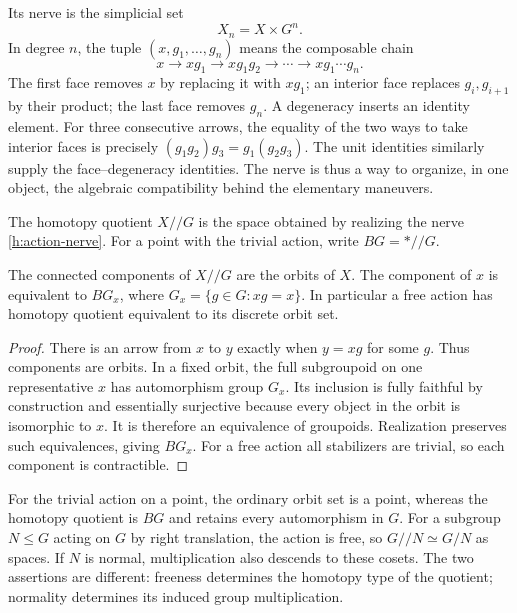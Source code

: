 Its nerve is the simplicial set
\begin{equation}\label{h:action-nerve}
 X_n=X\times G^n.
\end{equation}
In degree $n$, the tuple $(x,g_1,\ldots,g_n)$ means the composable chain
\[
 x\longrightarrow xg_1\longrightarrow xg_1g_2
   \longrightarrow\cdots\longrightarrow xg_1\cdots g_n.
\]
The first face removes $x$ by replacing it with $xg_1$; an interior face
replaces $g_i,g_{i+1}$ by their product; the last face removes $g_n$.
A degeneracy inserts an identity element.  For three consecutive arrows,
the equality of the two ways to take interior faces is precisely
$(g_1g_2)g_3=g_1(g_2g_3)$.  The unit identities similarly supply the
face--degeneracy identities.  The nerve is thus a way to organize, in
one object, the algebraic compatibility behind the elementary maneuvers.

\begin{definition}\label{h:homotopy-quotient}
The homotopy quotient $X/\!/G$ is the space obtained by realizing the
nerve \eqref{h:action-nerve}.  For a point with the trivial action, write
$BG=*/\!/G$.
\end{definition}

\begin{proposition}\label{h:stabilizers}
The connected components of $X/\!/G$ are the orbits of $X$.  The component
of $x$ is equivalent to $BG_x$, where
$G_x=\{g\in G:xg=x\}$.  In particular a free action has homotopy quotient
equivalent to its discrete orbit set.
\end{proposition}
\begin{proof}
There is an arrow from $x$ to $y$ exactly when $y=xg$ for some $g$.
Thus components are orbits.  In a fixed orbit, the full subgroupoid on
one representative $x$ has automorphism group $G_x$.  Its inclusion is
fully faithful by construction and essentially surjective because every
object in the orbit is isomorphic to $x$.  It is therefore an equivalence
of groupoids.  Realization preserves such equivalences, giving $BG_x$.
For a free action all stabilizers are trivial, so each component is
contractible.
\end{proof}

For the trivial action on a point, the ordinary orbit set is a point,
whereas the homotopy quotient is $BG$ and retains every automorphism in
$G$.  For a subgroup $N\leq G$ acting on $G$ by right translation, the
action is free, so $G/\!/N\simeq G/N$ as spaces.  If $N$ is normal,
multiplication also descends to these cosets.  The two assertions are
different: freeness determines the homotopy type of the quotient;
normality determines its induced group multiplication.

